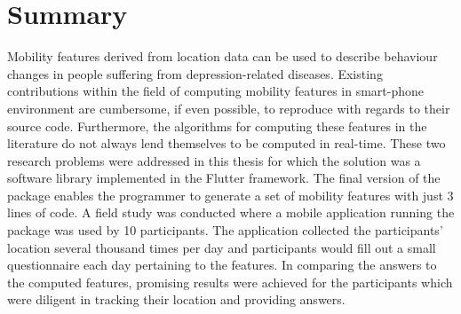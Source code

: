 \chapter{Summary}
Mobility features derived from location data can be used to describe behaviour changes in people suffering from depression-related diseases. Existing contributions within the field of computing mobility features in smart-phone environment are cumbersome, if even possible, to reproduce with regards to their source code. Furthermore, the algorithms for computing these features in the literature do not always lend themselves to be computed in real-time. These two research problems were addressed in this thesis for which the solution was a software library implemented in the Flutter framework. The final version of the package enables the programmer to generate a set of mobility features with just 3 lines of code. A field study was conducted where a mobile application running the package was used by 10 participants. The application collected the participants' location several thousand times per day and participants would fill out a small questionnaire each day pertaining to the features. In comparing the answers to the computed features, promising results were achieved for the participants which were diligent in tracking their location and providing answers. 